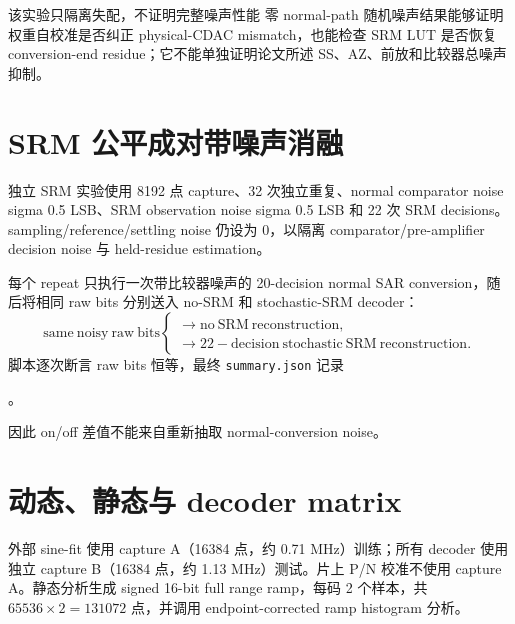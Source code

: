 \documentclass[UTF8,fontset=none,a4paper,11pt,openany]{ctexrep}
\begin{document}
\begin{riskbox}{该实验只隔离失配，不证明完整噪声性能}
零 normal-path 随机噪声结果能够证明权重自校准是否纠正 physical-CDAC mismatch，也能检查 SRM LUT 是否恢复 conversion-end residue；它不能单独证明论文所述 SS、AZ、前放和比较器总噪声抑制。
\end{riskbox}

\section{SRM 公平成对带噪声消融}

独立 SRM 实验使用 8192 点 capture、32 次独立重复、normal comparator noise sigma 0.5 LSB、SRM observation noise sigma 0.5 LSB 和 22 次 SRM decisions。sampling/reference/settling noise 仍设为 0，以隔离 comparator/pre-amplifier decision noise 与 held-residue estimation。

每个 repeat 只执行一次带比较器噪声的 20-decision normal SAR conversion，随后将相同 raw bits 分别送入 no-SRM 和 stochastic-SRM decoder：
\begin{equation}
\mathrm{same\ noisy\ raw\ bits}
\begin{cases}
\longrightarrow \mathrm{no\ SRM\ reconstruction},\\
\longrightarrow \mathrm{22\!\!-decision\ stochastic\ SRM\ reconstruction}.
\end{cases}
\end{equation}
脚本逐次断言 raw bits 恒等，最终 \texttt{summary.json} 记录
\begin{center}
。
\end{center}
因此 on/off 差值不能来自重新抽取 normal-conversion noise。

\section{动态、静态与 decoder matrix}

外部 sine-fit 使用 capture A（16384 点，约 0.71 MHz）训练；所有 decoder 使用独立 capture B（16384 点，约 1.13 MHz）测试。片上 P/N 校准不使用 capture A。静态分析生成 signed 16-bit full range ramp，每码 2 个样本，共 $65536\times2=131072$ 点，并调用 endpoint-corrected ramp histogram 分析。
\end{document}

